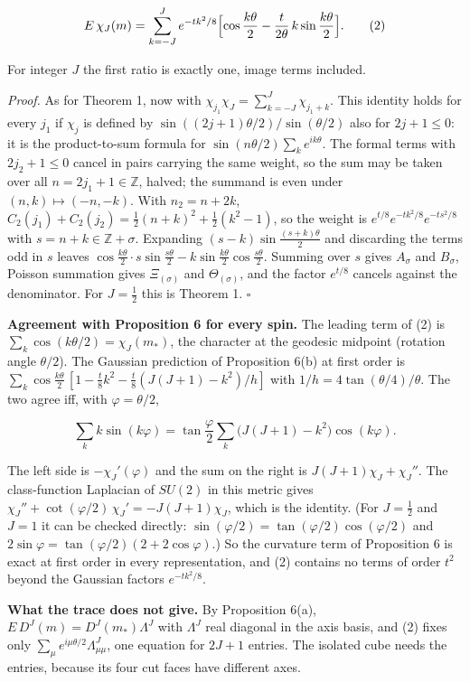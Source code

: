 \documentclass[11pt,a4paper]{article}
\begin{document}
\[E\,\chi_J(m)=\sum_{k=-J}^{J}e^{-tk^2/8}\Bigl[\cos\frac{k\theta}2
-\frac t{2\theta}\,k\sin\frac{k\theta}2\Bigr]. \tag{2}\]

For integer \(J\) the first ratio is exactly one, image terms included.

\emph{Proof.} As for Theorem 1, now with
\(\chi_{j_1}\chi_J=\sum_{k=-J}^{J}\chi_{j_1+k}\). This identity holds
for every \(j_1\) if \(\chi_j\) is defined by
\(\sin((2j+1)\theta/2)/\sin(\theta/2)\) also for \(2j+1\le0\): it is the
product-to-sum formula for \(\sin(n\theta/2)\sum_ke^{ik\theta}\). The
formal terms with \(2j_2+1\le0\) cancel in pairs carrying the same
weight, so the sum may be taken over all \(n=2j_1+1\in\mathbb Z\),
halved; the summand is even under \((n,k)\mapsto(-n,-k)\). With
\(n_2=n+2k\), \(C_2(j_1)+C_2(j_2)=\frac12(n+k)^2+\frac12(k^2-1)\), so
the weight is \(e^{t/8}e^{-tk^2/8}e^{-ts^2/8}\) with
\(s=n+k\in\mathbb Z+\sigma\). Expanding \((s-k)\sin\frac{(s+k)\theta}2\)
and discarding the terms odd in \(s\) leaves
\(\cos\frac{k\theta}2\cdot s\sin\frac{s\theta}2-k\sin\frac{k\theta}2\cos\frac{s\theta}2\).
Summing over \(s\) gives \(A_\sigma\) and \(B_\sigma\), Poisson
summation gives \(\Xi_{(\sigma)}\) and \(\Theta_{(\sigma)}\), and the
factor \(e^{t/8}\) cancels against the denominator. For \(J=\frac12\)
this is Theorem 1. \(\square\)

\textbf{Agreement with Proposition 6 for every spin.} The leading term
of (2) is \(\sum_k\cos(k\theta/2)=\chi_J(m_*)\), the character at the
geodesic midpoint (rotation angle \(\theta/2\)). The Gaussian prediction
of Proposition 6(b) at first order is
\(\sum_k\cos\frac{k\theta}2\,[1-\frac t8k^2-\frac t8(J(J+1)-k^2)/h]\)
with \(1/h=4\tan(\theta/4)/\theta\). The two agree iff, with
\(\varphi=\theta/2\),

\[\sum_kk\sin(k\varphi)=\tan\frac\varphi2\sum_k\bigl(J(J+1)-k^2\bigr)\cos(k\varphi).\]

The left side is \(-\chi_J'(\varphi)\) and the sum on the right is
\(J(J+1)\chi_J+\chi_J''\). The class-function Laplacian of \(SU(2)\) in
this metric gives \(\chi_J''+\cot(\varphi/2)\,\chi_J'=-J(J+1)\chi_J\),
which is the identity. (For \(J=\frac12\) and \(J=1\) it can be checked
directly: \(\sin(\varphi/2)=\tan(\varphi/2)\cos(\varphi/2)\) and
\(2\sin\varphi=\tan(\varphi/2)(2+2\cos\varphi)\).) So the curvature term
of Proposition 6 is exact at first order in every representation, and
(2) contains no terms of order \(t^2\) beyond the Gaussian factors
\(e^{-tk^2/8}\).

\textbf{What the trace does not give.} By Proposition 6(a),
\(E\,D^J(m)=D^J(m_*)\Lambda^J\) with \(\Lambda^J\) real diagonal in the
axis basis, and (2) fixes only
\(\sum_\mu e^{i\mu\theta/2}\Lambda^J_{\mu\mu}\), one equation for
\(2J+1\) entries. The isolated cube needs the entries, because its four
cut faces have different axes.
\end{document}
